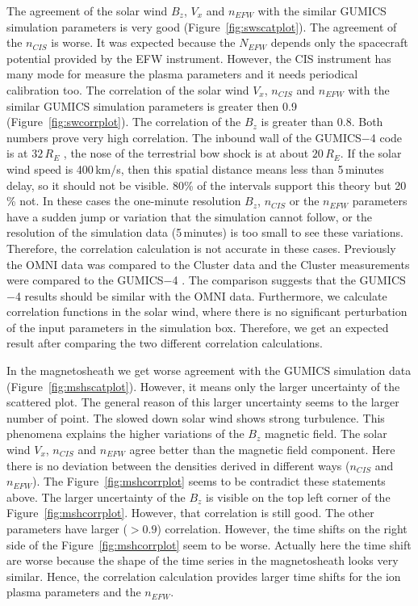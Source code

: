 \documentclass[linenumbers,draft]{agujournal}
\begin{document}
The agreement of the solar wind $B_{z}$, $V_{x}$ and $n_{EFW}$ with the similar GUMICS simulation parameters is very good (Figure~\ref{fig:swscatplot}). The agreement of the $n_{CIS}$ is worse. It was expected because the $N_{EFW}$ depends only the spacecraft potential provided by the EFW instrument. However, the CIS instrument has many mode for measure the plasma parameters and it needs periodical calibration too. The correlation of the solar wind $V_{x}$,  $n_{CIS}$ and $n_{EFW}$ with the similar GUMICS simulation parameters is greater then 0.9 (Figure~\ref{fig:swcorrplot}). The correlation of the $B_{z}$ is greater than 0.8. Both numbers prove very high correlation. The inbound wall of the GUMICS$-$4 code is at $32\,R_E$ \citep{janhunen12:_gumic_mhd}, the nose of the terrestrial bow shock is at about $20\,R_E$. If the solar wind speed is 400\,km/s, then this spatial distance means less than 5\,minutes delay, so it should not be visible. 80\% of the intervals support this theory but 20\,\% not. In these cases the one-minute resolution $B_z$, $n_{CIS}$ or the $n_{EFW}$ parameters have a sudden jump or variation that the simulation cannot follow, or the resolution of the simulation data (5\,minutes) is too small to see these variations. Therefore, the correlation calculation is not accurate in these cases. Previously the OMNI data was compared to the Cluster data and the Cluster measurements were compared to the GUMICS$-$4 \citep{facsko16:_one_earth}. The comparison suggests that the GUMICS$-$4 results should be similar with the OMNI data. Furthermore, we calculate correlation functions in the solar wind, where there is no significant perturbation of the input parameters in the simulation box. Therefore, we get an expected result after comparing the two different correlation calculations.

In the magnetosheath we get worse agreement with the GUMICS simulation data (Figure~\ref{fig:mshscatplot}). However, it means only the larger uncertainty of the scattered plot. The general reason of this larger uncertainty seems to the larger number of point. The slowed down solar wind shows strong turbulence. This phenomena explains the higher variations of the $B_{z}$ magnetic field. The solar wind $V_{x}$, $n_{CIS}$ and $n_{EFW}$ agree better than the magnetic field component. Here there is no deviation between the densities derived in different ways ($n_{CIS}$ and $n_{EFW}$). The Figure~\ref{fig:mshcorrplot} seems to be contradict these statements above. The larger uncertainty of the $B_{z}$ is visible on the top left corner of the Figure~\ref{fig:mshcorrplot}. However, that correlation is still good. The other parameters have larger ($>0.9$) correlation. However, the time shifts on the right side of the Figure~\ref{fig:mshcorrplot} seem to be worse. Actually here the time shift are worse because the shape of the time series in the magnetosheath looks very similar. Hence, the correlation calculation provides larger time shifts for the ion plasma parameters and the $n_{EFW}$. 
\end{document}
